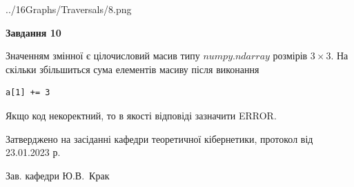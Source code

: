 \documentclass[12pt, ukrainian]{article}
\begin{document}
{\begin {large}
\begin{center}
	{../16Graphs/Traversals/8.png}
\end{center}\par
\newpage

{\begin {center}\textbf{Завдання 10}\end {center}}\par
Значенням змінної  є цілочисловий масив типу $numpy.ndarray$ розмірів $3{\times}3$. На скільки збільшиться сума елементів масиву  після виконання
\begin{verbatim}
a[1] += 3
\end{verbatim}


Якщо код некоректний, то в якості відповіді зазначити ERROR.\par
\newpage


\end {large}
}
{\smallskip \begin {small} Затверджено на засіданні кафедри теоретичної кібернетики, протокол  від   23.01.2023 р.\par\smallskip\smallskip
{\parbox {6.5 cm}{Зав. кафедри \dotfill Ю.В.~Крак}} \end{small}}
\end{document}
